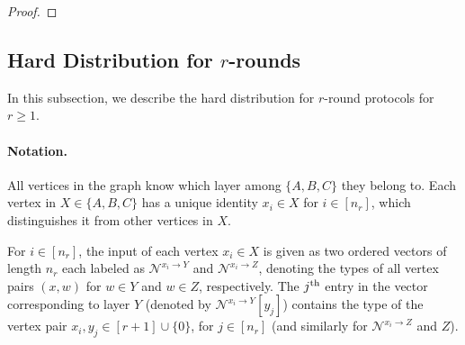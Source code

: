 \documentclass[11pt]{article}
\theoremstyle{definition}
\renewcommand{\geq}{\geqslant}
\newcommand{\prot}{\ensuremath{\pi}}
\newcommand{\ystar}{\ensuremath{y^{*}}}
\newcommand{\zstar}{\ensuremath{z^{*}}}
\newcommand{\astar}{\ensuremath{a^*}}
\newcommand{\bstar}{\ensuremath{b^*}}
\newcommand{\cstar}{\ensuremath{c^*}}
\newcommand{\Nbhood}[3]{\ensuremath{\mathcal{N}^{#1_{#3} \to #2}}}
\begin{document}
\begin{proof}
\end{proof}


\subsection{Hard Distribution for $r$-rounds}

In this subsection, we describe the hard distribution for $r$-round protocols for $r \geq 1$. 
\vspace{-0.15cm}
\paragraph{Notation.}
 All vertices in the graph know which layer among $\{A, B, C\}$ they belong to. Each vertex in $X \in \{A, B, C\}$ has a unique identity $x_i \in X$ for $i \in [n_r]$, which distinguishes it from other vertices in $X$.

For $i \in [n_r]$, the input of each vertex $x_i \in X$ is given as two ordered vectors of length $n_r$ each labeled as $\Nbhood{x}{Y}{i}$ and $\Nbhood{x}{Z}{i}$, denoting the types of all vertex pairs $(x, w)$  for $w \in Y$ and $w \in Z$, respectively. 
The $j^{\textnormal{th}}$ entry in the vector corresponding to layer $Y$ (denoted by $\Nbhood{x}{Y}{i}[y_j]$) contains the type of the vertex pair $x_i, y_j \in [r+1] \cup \{0\}$, for $j \in [n_r]$ (and similarly for $\Nbhood{x}{Z}{i}$ and $Z$). 
\end{document}
